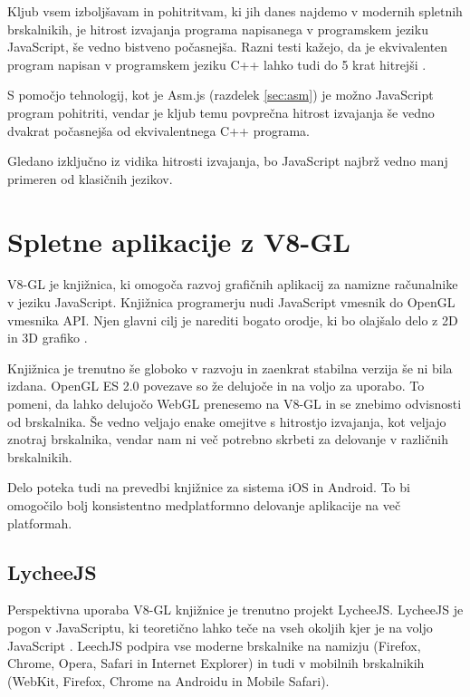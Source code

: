 Kljub vsem izboljšavam in pohitritvam, ki jih danes najdemo v modernih spletnih brskalnikih, je hitrost izvajanja programa napisanega v programskem jeziku JavaScript, še vedno bistveno počasnejša. Razni testi kažejo, da je ekvivalenten program napisan v programskem jeziku C++ lahko tudi do 5 krat hitrejši \cite{jsperformance}.

S pomočjo tehnologij, kot je Asm.js (razdelek \ref{sec:asm}) je možno JavaScript program pohitriti, vendar je kljub temu povprečna hitrost izvajanja še vedno dvakrat počasnejša od ekvivalentnega C++ programa.

Gledano izključno iz vidika hitrosti izvajanja, bo JavaScript najbrž vedno manj primeren od klasičnih jezikov.

\section{Spletne aplikacije z V8-GL}

V8-GL je knjižnica, ki omogoča razvoj grafičnih aplikacij za namizne računalnike v jeziku JavaScript. Knjižnica programerju nudi JavaScript vmesnik do OpenGL vmesnika API. Njen glavni cilj je narediti bogato orodje, ki bo olajšalo delo z 2D in 3D grafiko \cite{v8gl}.

Knjižnica je trenutno še globoko v razvoju in zaenkrat stabilna verzija še ni bila izdana. OpenGL ES 2.0 povezave so že delujoče in na voljo za uporabo. To pomeni, da lahko delujočo WebGL prenesemo na V8-GL in se znebimo odvisnosti od brskalnika. Še vedno veljajo enake omejitve s hitrostjo izvajanja, kot veljajo znotraj brskalnika, vendar nam ni več potrebno skrbeti za delovanje v različnih brskalnikih.

Delo poteka tudi na prevedbi knjižnice za sistema iOS in Android. To bi omogočilo bolj konsistentno medplatformno delovanje aplikacije na več platformah.

\subsection{LycheeJS}

Perspektivna uporaba V8-GL knjižnice je trenutno projekt LycheeJS. LycheeJS je pogon v JavaScriptu, ki teoretično lahko teče na vseh okoljih kjer je na voljo JavaScript  \cite{lycheejs}. LeechJS podpira vse moderne brskalnike na namizju (Firefox, Chrome, Opera, Safari in Internet Explorer) in tudi v mobilnih brskalnikih (WebKit, Firefox, Chrome na Androidu in Mobile Safari). 

